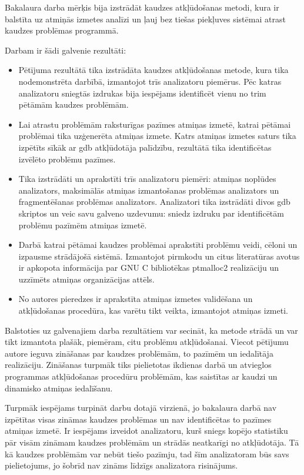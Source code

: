 ﻿Bakalaura darba mērķis bija izstrādāt kaudzes atkļūdošanas metodi, kura ir balstīta uz atmiņās izmetes analīzi un ļauj bez tiešas piekļuves sistēmai atrast kaudzes problēmas programmā.

Darbam ir šādi galvenie rezultāti:
\begin{itemize}
    \item Pētījuma rezultātā tika izstrādāta kaudzes atkļūdošanas metode, kura tika nodemonstrēta darbībā, izmantojot trīs analizatoru piemērus.
    Pēc katras analizatoru sniegtās izdrukas bija iespējams identificēt vienu no trim pētāmām kaudzes problēmām.
    \item Lai atrastu problēmām raksturīgas pazīmes atmiņas izmetē, katrai pētāmai problēmai tika uzģenerēta atmiņas izmete.
    Katrs atmiņas izmetes saturs tika izpētīts sīkāk ar gdb atkļūdotāja palīdzību, rezultātā tika identificētas izvēlēto problēmu pazīmes.
    \item Tika izstrādāti un aprakstīti trīs analizatoru piemēri: atmiņas noplūdes analizators, maksimālās atmiņas izmantošanas problēmas analizators un fragmentēšanas problēmas analizators.
    Analizatori tika izstrādāti divos gdb skriptos un veic savu galveno uzdevumu: sniedz izdruku par identificētām problēmu pazīmēm atmiņas izmetē. 
    \item Darbā katrai pētāmai kaudzes problēmai aprakstīti problēmu veidi, cēloni un izpausme strādājošā sistēmā. 
    Izmantojot pirmkodu un citus literatūras avotus ir apkopota informācija par GNU C bibliotēkas ptmalloc2 realizāciju un uzzīmēts atmiņas organizācijas attēls. 
    \item No autores pieredzes ir aprakstīta atmiņas izmetes validēšana un atkļūdošanas procedūra, kas varētu tikt veikta, izmantojot atmiņas izmeti.
\end{itemize}

Balstoties uz galvenajiem darba rezultātiem var secināt, ka metode strādā un var tikt izmantota plašāk, piemēram, citu problēmu atkļūdošanai.
Viecot pētījumu autore ieguva zināšanas par kaudzes problēmām, to pazīmēm un iedalītāja realizāciju.
Zināšanas turpmāk tiks pielietotas ikdienas darbā un atvieglos programmas atkļūdošanas procedūru problēmām, kas saistītas ar kaudzi un dinamisko atmiņas iedalīšanu. 

Turpmāk iespējams turpināt darbu dotajā virzienā, jo bakalaura darbā nav izpētītas visas zināmas kaudzes problēmas un nav identificētas to pazīmes atmiņas izmetē.
Ir iespējams izveidot analizatoru, kurš sniegs kopējo statistiku pār visām zināmam kaudzes problēmām un strādās neatkarīgi no atkļūdotāja. 
Tā kā kaudzes problēmām var nebūt tiešo pazīmju, tad šīm analizatoram būs savs pielietojums, jo šobrīd nav zināms līdzīgs analizatora risinājums.
